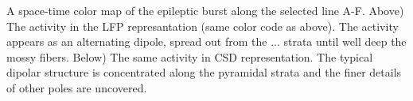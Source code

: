 A space-time color map of the epileptic burst along the selected line A-F.
Above) The activity in the LFP represantation (same color code as above). The
activity appears as an alternating dipole, spread out from the ... strata
until well deep the mossy fibers.
Below) The same activity in CSD representation. The typical dipolar
structure is concentrated along the pyramidal strata and the finer details of other
poles are uncovered.


